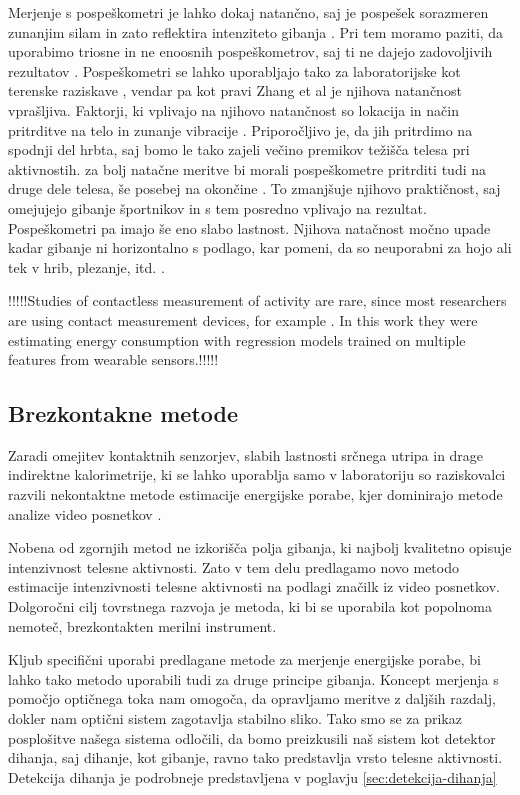 Merjenje s pospeškometri je lahko dokaj natančno, saj je pospešek sorazmeren zunanjim silam in zato reflektira intenziteto gibanja \cite{yang2010review}. Pri tem moramo paziti, da uporabimo triosne in ne enoosnih pospeškometrov, saj ti ne dajejo zadovoljivih rezultatov \cite{levine2005measurement}. Pospeškometri se lahko uporabljajo tako za laboratorijske kot terenske raziskave \cite{yang2014sleep}, vendar pa kot pravi Zhang et al \cite{zhang2004improving} je njihova natančnost vprašljiva. Faktorji, ki vplivajo na njihovo natančnost so lokacija in način pritrditve na telo in zunanje vibracije \cite{yang2010review}. Priporočljivo je, da jih pritrdimo na spodnji del hrbta, saj bomo le tako zajeli večino premikov težišča telesa pri aktivnostih. za bolj natačne meritve bi morali pospeškometre pritrditi tudi na druge dele telesa, še posebej na okončine \cite{yang2010review}. To zmanjšuje njihovo praktičnost, saj omejujejo gibanje športnikov in s tem posredno vplivajo na rezultat. Pospeškometri pa imajo še eno slabo lastnost. Njihova natačnost močno upade kadar gibanje ni horizontalno s podlago, kar pomeni, da so neuporabni za hojo ali tek v hrib, plezanje, itd. \cite{yang2010review}.

!!!!!Studies of contactless measurement of activity are rare, since most researchers are using contact measurement devices, for example \cite{gjoreski2015context}. In this work they were estimating energy consumption with regression models trained on multiple features from wearable sensors.!!!!!


\subsection{Brezkontakne metode}

Zaradi omejitev kontaktnih senzorjev, slabih lastnosti srčnega utripa in drage indirektne kalorimetrije, ki se lahko uporablja samo v laboratoriju so raziskovalci razvili nekontaktne metode estimacije energijske porabe, kjer dominirajo metode analize video posnetkov \cite{botton2011energy,osgnach2010energy,silva2015assessing,peker2004framework,nathan2015estimating}. 

Nobena od zgornjih metod ne izkorišča polja gibanja, ki najbolj kvalitetno opisuje intenzivnost telesne aktivnosti. Zato v tem delu predlagamo novo metodo estimacije intenzivnosti telesne aktivnosti na podlagi značilk iz video posnetkov. Dolgoročni cilj tovrstnega razvoja je metoda, ki bi se uporabila kot popolnoma nemoteč, brezkontakten merilni instrument.

Kljub specifični uporabi predlagane metode za merjenje energijske porabe, bi lahko tako metodo uporabili tudi za druge principe gibanja. Koncept merjenja s pomočjo optičnega toka nam omogoča, da opravljamo meritve z daljših razdalj, dokler nam optični sistem zagotavlja stabilno sliko. Tako smo se za prikaz posplošitve našega sistema odločili, da bomo preizkusili naš sistem kot detektor dihanja, saj dihanje, kot gibanje, ravno tako predstavlja vrsto telesne aktivnosti. Detekcija dihanja je podrobneje predstavljena v poglavju \ref{sec:detekcija-dihanja}